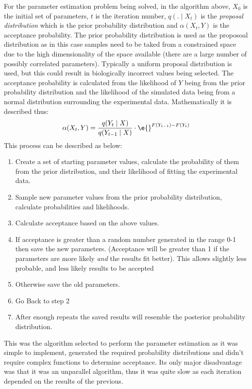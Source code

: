 For the parameter estimation problem being solved, in the algorithm above, $X_0$ is the initial set of parameters, $t$ is the iteration number, $q(.\mid X_t)$ is the \textit{proposal distribution} which is the prior probability distribution and $\alpha(X_t,Y)$ is the acceptance probability. The prior probability distribution is used as the proposoal distribution as in this case samples need to be taked from a constrained space due to the high dimensionality of the space available (there are a large number of possibly correlated parameters). Typically a uniform proposal distribution is used, but this could result in biologically incorrect values being selected. The acceptance probability is calculated from the likelihood of $Y$ being from the prior probability distribution and the likelihood of the simulated data being from a normal distribution surrounding the experimental data. Mathematically it is described thus:
\begin{equation*}
\alpha(X_t,Y) = \frac{q(Y_t\mid X)}{q(Y_{t-1}\mid X)}\cdot\e{}^{F(Y_{t-1}) - F(Y_t)}
\end{equation*}
This process can be described as below:
\begin{enumerate}
\item Create a set of starting parameter values, calculate the probability of them from the prior distribution, and their likelihood of fitting the experimental data.
\item Sample new parameter values from the prior probability distribution, calculate probabilities and likelihoods.
\item Calculate acceptance based on the above values.
\item If acceptance is greater than a random number generated in the range 0-1 then save the new parameters. (Acceptance will be greater than 1 if the parameters are more likely \textit{and} the results fit better). This allows slightly less probable, and less likely results to be accepted
\item Otherwise save the old parameters.
\item Go Back to step 2
\item After enough repeats the saved results will resemble the posterior probability distribution.
\end{enumerate}
This was the algorithm selected to perform the parameter estimation as it was simple to implement, generated the required probability distributions and didn't require complex functions to determine acceptance. Its only major disadvantage was that it was an unparallel algorithm, thus it was quite slow as each iteration depended on the results of the previous.

